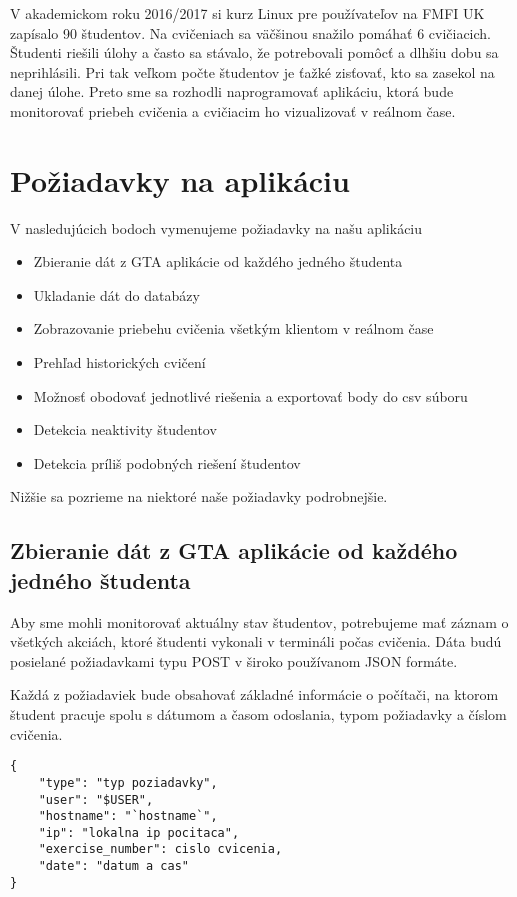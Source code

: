 V akademickom roku 2016/2017 si kurz Linux pre používateľov na FMFI UK zapísalo
90 študentov. Na cvičeniach sa väčšinou snažilo pomáhať 6 cvičiacich. Študenti riešili
úlohy a často sa stávalo, že potrebovali pomôcť a dlhšiu dobu sa neprihlásili. Pri tak veľkom počte študentov je ťažké zisťovať, kto sa zasekol na danej úlohe. Preto sme sa
rozhodli naprogramovať aplikáciu, ktorá bude monitorovať priebeh cvičenia a cvičiacim
ho vizualizovať v reálnom čase.

\section{Požiadavky na aplikáciu}
\label{sec:apprequirements}

V nasledujúcich bodoch vymenujeme požiadavky na našu aplikáciu

\begin{itemize}
	\item Zbieranie dát z GTA aplikácie od každého jedného študenta
	\item Ukladanie dát do databázy
	\item Zobrazovanie priebehu cvičenia všetkým klientom v reálnom čase
	\item Prehľad historických cvičení
	\item Možnosť obodovať jednotlivé riešenia a exportovať body do csv súboru
	\item Detekcia neaktivity študentov
	\item Detekcia príliš podobných riešení študentov
\end{itemize}

Nižšie sa pozrieme na niektoré naše požiadavky podrobnejšie.

\subsection{Zbieranie dát z GTA aplikácie od každého jedného študenta}
\label{sec:apprequirements:gtadata}

Aby sme mohli monitorovať aktuálny stav študentov, potrebujeme mať záznam o
všetkých akciách, ktoré študenti vykonali v termináli počas cvičenia.
Dáta budú posielané požiadavkami typu POST v široko používanom JSON formáte.

Každá z požiadaviek bude obsahovať základné informácie o počítači, na ktorom
študent pracuje spolu s dátumom a časom odoslania, typom požiadavky a číslom cvičenia.

\begin{lstlisting}
{
    "type": "typ poziadavky",
    "user": "$USER",
    "hostname": "`hostname`",
    "ip": "lokalna ip pocitaca",
    "exercise_number": cislo cvicenia,
    "date": "datum a cas"
}
\end{lstlisting}

